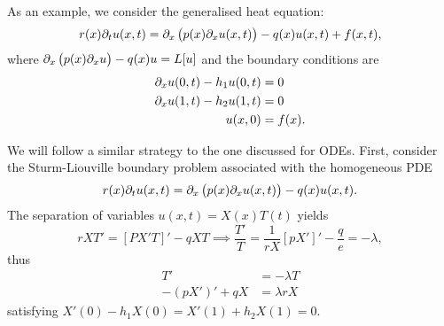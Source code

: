 \begin{eg}
	As an example, we consider the generalised heat equation:
	\[
		r(x) \partial_t u(x,t) = \partial_x\left(p(x) \partial_x u(x,t)\right) - q(x) u(x,t) + f(x,t),
	\]
	where $\partial_x\left(p(x) \partial_x u\right) - q(x) u = L[u]$ and the boundary conditions are
	\begin{align*}
		\partial_x u(0,t) - h_1 u(0,t) &= 0 \\
		\partial_x u(1,t) - h_2 u(1,t) &= 0 \\
		u(x,0) &= f(x).
	\end{align*}
	
	We will follow a similar strategy to the one discussed for ODEs. First, consider the Sturm-Liouville boundary problem associated with the homogeneous PDE
	\[
		r(x) \partial_t u(x,t) = \partial_x\left(p(x) \partial_x u(x,t)\right) - q(x) u(x,t).
	\]
	The separation of variables $u(x,t) = X(x)T(t)$ yields
	\[
		rXT' = [PX'T]' - qXT \implies \frac{T'}{T} = \frac{1}{rX}[pX']' - \frac{q}{e} = -\lambda,
	\]
	thus
	\begin{align*}
		T' &= -\lambda T \\
		-(pX')' + qX &= \lambda rX
	\end{align*}
	satisfying $X'(0) - h_1X(0) = X'(1) + h_2X(1) = 0$.
	

\end{eg}
